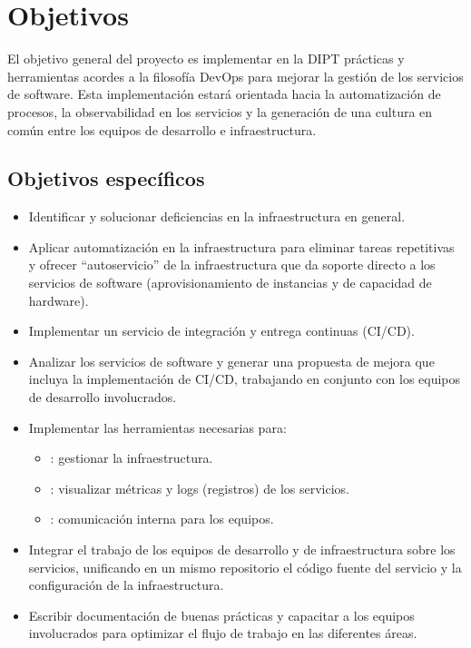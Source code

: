 \section{Objetivos}

El objetivo general del proyecto es implementar en la DIPT prácticas y
herramientas acordes a la filosofía DevOps para mejorar la gestión de
los servicios de software. Esta implementación estará orientada hacia
la automatización de procesos, la observabilidad en los servicios y la
generación de una cultura en común entre los equipos de desarrollo e
infraestructura.

\subsection{Objetivos específicos}

\begin{itemize}
\item Identificar y solucionar deficiencias en la infraestructura en
  general.
\item Aplicar automatización en la infraestructura para eliminar
  tareas repetitivas y ofrecer ``autoservicio'' de la infraestructura
  que da soporte directo a los servicios de software
  (aprovisionamiento de instancias y de capacidad de hardware).
\item Implementar un servicio de integración y entrega continuas
  (CI/CD).
\item Analizar los servicios de software y generar una propuesta de
  mejora que incluya la implementación de CI/CD, trabajando en
  conjunto con los equipos de desarrollo involucrados.
\item Implementar las herramientas necesarias para:
\begin{itemize}
\item {}: gestionar la infraestructura.
\item {}: visualizar métricas y logs (registros)
  de los servicios.
\item {}: comunicación interna para los equipos.
\end{itemize}
\item Integrar el trabajo de los equipos de desarrollo y de
  infraestructura sobre los servicios, unificando en un mismo
  repositorio el código fuente del servicio y la configuración de la
  infraestructura.
\item Escribir documentación de buenas prácticas y capacitar a los
  equipos involucrados para optimizar el flujo de trabajo en las
  diferentes áreas.
\end{itemize}
